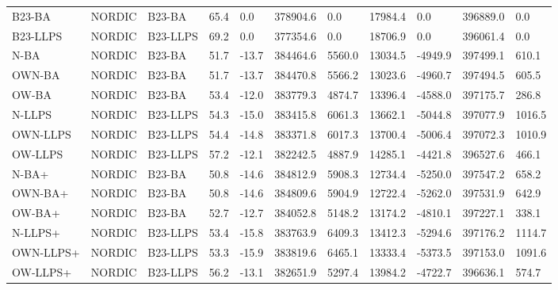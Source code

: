 \begin{table}
\begin{tabular}{lllllllllll}
B23-BA & NORDIC & B23-BA & 65.4 & 0.0 & 378904.6 & 0.0 & 17984.4 & 0.0 & 396889.0 & 0.0 \\
B23-LLPS & NORDIC & B23-LLPS & 69.2 & 0.0 & 377354.6 & 0.0 & 18706.9 & 0.0 & 396061.4 & 0.0 \\
N-BA & NORDIC & B23-BA & 51.7 & -13.7 & 384464.6 & 5560.0 & 13034.5 & -4949.9 & 397499.1 & 610.1 \\
OWN-BA & NORDIC & B23-BA & 51.7 & -13.7 & 384470.8 & 5566.2 & 13023.6 & -4960.7 & 397494.5 & 605.5 \\
OW-BA & NORDIC & B23-BA & 53.4 & -12.0 & 383779.3 & 4874.7 & 13396.4 & -4588.0 & 397175.7 & 286.8 \\
N-LLPS & NORDIC & B23-LLPS & 54.3 & -15.0 & 383415.8 & 6061.3 & 13662.1 & -5044.8 & 397077.9 & 1016.5 \\
OWN-LLPS & NORDIC & B23-LLPS & 54.4 & -14.8 & 383371.8 & 6017.3 & 13700.4 & -5006.4 & 397072.3 & 1010.9 \\
OW-LLPS & NORDIC & B23-LLPS & 57.2 & -12.1 & 382242.5 & 4887.9 & 14285.1 & -4421.8 & 396527.6 & 466.1 \\
N-BA+ & NORDIC & B23-BA & 50.8 & -14.6 & 384812.9 & 5908.3 & 12734.4 & -5250.0 & 397547.2 & 658.2 \\
OWN-BA+ & NORDIC & B23-BA & 50.8 & -14.6 & 384809.6 & 5904.9 & 12722.4 & -5262.0 & 397531.9 & 642.9 \\
OW-BA+ & NORDIC & B23-BA & 52.7 & -12.7 & 384052.8 & 5148.2 & 13174.2 & -4810.1 & 397227.1 & 338.1 \\
N-LLPS+ & NORDIC & B23-LLPS & 53.4 & -15.8 & 383763.9 & 6409.3 & 13412.3 & -5294.6 & 397176.2 & 1114.7 \\
OWN-LLPS+ & NORDIC & B23-LLPS & 53.3 & -15.9 & 383819.6 & 6465.1 & 13333.4 & -5373.5 & 397153.0 & 1091.6 \\
OW-LLPS+ & NORDIC & B23-LLPS & 56.2 & -13.1 & 382651.9 & 5297.4 & 13984.2 & -4722.7 & 396636.1 & 574.7 \\
\bottomrule
\end{tabular}
\end{table}
